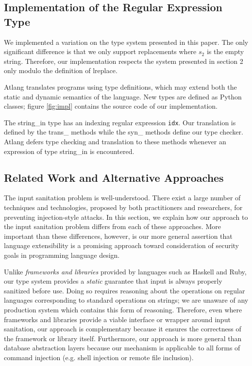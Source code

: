 \documentclass[9pt]{sig-alternate}
\theoremstyle{definition}
\begin{document}
\subsection{Implementation of the Regular Expression Type}

We implemented a variation on the type system presented in this paper. The only
significant difference is that we only support replacements where $s_2$ is the empty
string. Therefore, our implementation respects the system presented in section 2
only modulo the definition of \textsf{lreplace}.

Atlang translates programs using type definitions, which may extend both the
static and dynamic semantics of the language. New types are defined as Python
classes; figure \ref{fig:impl} contains the source code of our implementation.

The \textsf{string_in} type has an indexing regular expression \texttt{idx}.
Our translation is defined by the \textsf{trans_} methods while the \textsf{syn_}
methods define our type checker. Atlang defers type checking and translation
to these methods whenever an expression of type \textsf{string_in} is encountered.


\subsection{Related Work and Alternative Approaches}

The input sanitation problem is well-understood. There exist a large number of techniques and technologies, proposed by both practitioners and researchers, for preventing injection-style attacks. In this section, we explain how our approach to the input sanitation problem differs from each of these approaches. More important than these differences, however, is our more general assertion that language extensibility is a promising approach toward consideration of security goals in programming language design.

Unlike \emph{frameworks and libraries} provided by languages such as Haskell and Ruby, our type system provides a \emph{static} guarantee that input is always properly sanitized before use. Doing so requires reasoning about the operations on regular languages corresponding to standard operations on strings; we are unaware of any production system which contains this form of reasoning. Therefore, even where frameworks and libraries provide a viable interface or wrapper around input sanitation, our approach is complementary because it ensures the correctness of the framework or library itself. Furthermore, our approach is more general than database abstraction layers because our mechanism is applicable to all forms of command injection (e.g. shell injection or remote file inclusion).
\end{document}
